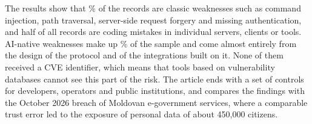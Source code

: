 \par The results show that \pClassic\% of the records are classic weaknesses such as command injection, path traversal, server-side request forgery and missing authentication, and half of all records are coding mistakes in individual servers, clients or tools. AI-native weaknesses make up \pNative\% of the sample and come almost entirely from the design of the protocol and of the integrations built on it. None of them received a CVE identifier, which means that tools based on vulnerability databases cannot see this part of the risk. The article ends with a set of controls for developers, operators and public institutions, and compares the findings with the October 2026 breach of Moldovan e-government services, where a comparable trust error led to the exposure of personal data of about 450,000 citizens.
